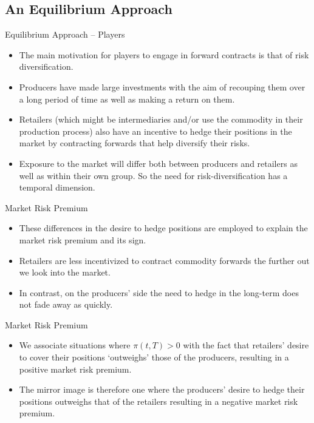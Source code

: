 \subsection{An Equilibrium Approach}

{Equilibrium Approach -- Players}

\begin{itemize}
\item<1->
The main
motivation for players to engage in forward contracts is that of
risk diversification.
\item<2->
Producers have made large investments with the
aim of recouping them over a long period of time as well as making a
return on them.
\item<3->
Retailers (which might be intermediaries and/or use the commodity in
their production process) also have an incentive to hedge their
positions in the market by contracting forwards that help diversify
their risks.
\item<4->
Exposure to the market will differ both between producers and
retailers as well as within their own group.
So the need for risk-diversification has a temporal dimension.
\end{itemize}

{Market Risk Premium}

\begin{itemize}
\item<1-> These differences in the
desire to hedge positions are employed to explain the market risk premium and
its sign.
\item<2-> Retailers are less incentivized to contract commodity forwards
the further out we look into the market.
\item<3-> In contrast, on the producers' side the need to hedge in the long-term
does not fade away as quickly.
\end{itemize}

{Market Risk Premium}
\begin{itemize}
\item<1-> We associate situations where
$\pi(t,T)>0$ with the fact that retailers' desire to cover their
positions `outweighs' those of the producers, resulting in a
positive market risk premium.
\item<2-> The mirror image is therefore one
where the producers' desire to hedge their positions outweighs that
of the retailers resulting in a negative market risk premium.

\end{itemize}

